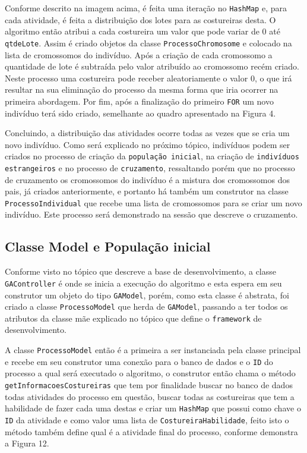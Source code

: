 \newpage
 
\par Conforme descrito na imagem acima, é feita uma iteração no \texttt{HashMap} e, para cada atividade, é feita a distribuição 
dos lotes para as costureiras desta. O algoritmo então atribui a cada costureira um valor que pode variar de 0 até \texttt{qtdeLote}. 
Assim é criado objetos da classe \texttt{ProcessoChromosome} e colocado na lista de cromossomos do indivíduo. Após a criação de cada cromossomo a quantidade de lote é subtraída pelo valor atribuído ao cromossomo recém criado.
Neste processo uma costureira pode receber aleatoriamente o valor 0, o que irá resultar na sua eliminação do processo da mesma forma
que iria ocorrer na primeira abordagem. Por fim, após a finalização do primeiro \texttt{FOR} um novo indivíduo terá sido criado, 
semelhante ao quadro apresentado na Figura 4.

\par Concluindo, a distribuição das atividades ocorre todas as vezes que se cria um novo indivíduo.
Como será explicado no próximo tópico, indivíduos podem ser criados no processo de criação da \texttt{população inicial}, 
na criação de \texttt{indivíduos estrangeiros} e no processo de \texttt{cruzamento}, ressaltando porém que no processo 
de cruzamento os cromossomos do indivíduo é a mistura dos cromossomos dos pais, já criados anteriormente, e portanto 
há também um construtor na classe \texttt{ProcessoIndividual} que recebe uma lista de cromossomos para se criar um novo indivíduo.
Este processo será demonstrado na sessão que descreve o cruzamento.

\subsection {Classe Model e População inicial}
\par Conforme visto no tópico que descreve a base de desenvolvimento, a classe \texttt{GAController} é onde se inicia 
a execução do algoritmo e esta espera em seu construtor um objeto do tipo \texttt{GAModel}, porém, como esta classe é 
abstrata, foi criado a classe \texttt{ProcessoModel} que herda de \texttt{GAModel}, passando a ter todos os atributos
da classe mãe explicado no tópico que define o \texttt{framework} de desenvolvimento.
\par A classe \texttt{ProcessoModel} então é a primeira a ser instanciada pela classe principal e recebe em seu construtor
uma conexão para o banco de dados e o \texttt{ID} do processo a qual será executado o algoritmo, o construtor então chama
o método \texttt{getInformacoesCostureiras} que tem por finalidade buscar no banco de dados todas atividades do processo em questão,
buscar todas as costureiras que tem a habilidade de fazer cada uma destas e criar um \texttt{HashMap} 
que possui como chave o \texttt{ID} da atividade e como valor uma lista de \texttt{CostureiraHabilidade}, feito isto o método 
também define qual é a atividade final do processo, conforme demonstra a Figura 12.


